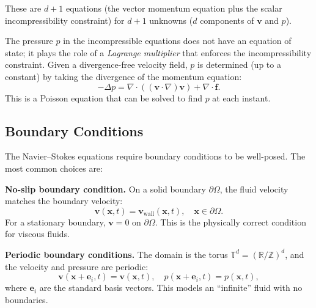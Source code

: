 These are $d + 1$ equations (the vector momentum equation plus the scalar incompressibility constraint) for $d + 1$ unknowns ($d$ components of $\mathbf{v}$ and $p$).

\begin{remark}
The pressure $p$ in the incompressible equations does not have an equation of state; it plays the role of a \emph{Lagrange multiplier} that enforces the incompressibility constraint. Given a divergence-free velocity field, $p$ is determined (up to a constant) by taking the divergence of the momentum equation:
\[
-\Delta p = \nabla \cdot \left( (\mathbf{v} \cdot \nabla)\mathbf{v} \right) + \nabla \cdot \mathbf{f}.
\]
This is a Poisson equation that can be solved to find $p$ at each instant.
\end{remark}

\subsection{Boundary Conditions}

The Navier--Stokes equations require boundary conditions to be well-posed. The most common choices are:

\begin{definition}
\textbf{No-slip boundary condition.} On a solid boundary $\partial \Omega$, the fluid velocity matches the boundary velocity:
\[
\mathbf{v}(\mathbf{x}, t) = \mathbf{v}_{\text{wall}}(\mathbf{x}, t), \quad \mathbf{x} \in \partial \Omega.
\]
For a stationary boundary, $\mathbf{v} = 0$ on $\partial \Omega$. This is the physically correct condition for viscous fluids.
\end{definition}

\begin{definition}
\textbf{Periodic boundary conditions.} The domain is the torus $\mathbb{T}^d = (\mathbb{R}/\mathbb{Z})^d$, and the velocity and pressure are periodic:
\[
\mathbf{v}(\mathbf{x} + \mathbf{e}_i, t) = \mathbf{v}(\mathbf{x}, t), \quad p(\mathbf{x} + \mathbf{e}_i, t) = p(\mathbf{x}, t),
\]
where $\mathbf{e}_i$ are the standard basis vectors. This models an ``infinite'' fluid with no boundaries.
\end{definition}

